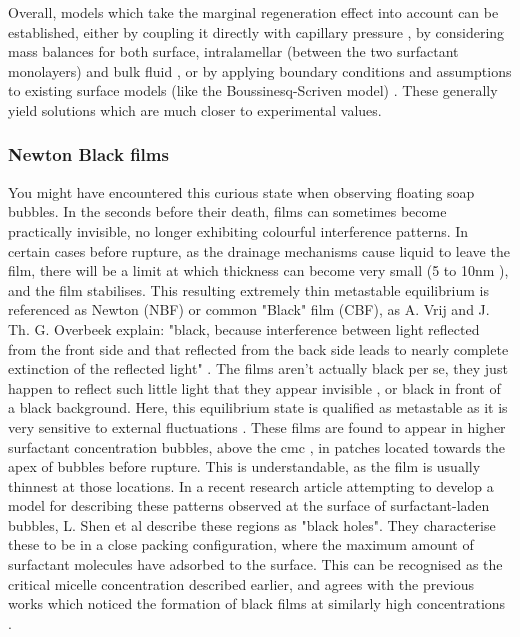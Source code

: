 \documentclass[a4paper,12pt]{article}
\numberwithin{equation}{section}
\numberwithin{figure}{section}
\numberwithin{table}{section}
\begin{document}
Overall, models which take the marginal regeneration effect into account can be established, either by coupling it directly with capillary pressure \cite{Lhuissier2011}, by considering mass balances for both surface, intralamellar (between the two surfactant monolayers) and bulk fluid \cite{Nierstrasz1999}, or by applying boundary conditions and assumptions to existing surface models (like the Boussinesq-Scriven model) \cite{Bhamla2017}. These generally yield solutions which are much closer to experimental values.

\subsubsection{Newton Black films}
\label{sec:blackfilms}

You might have encountered this curious state when observing floating soap bubbles. In the seconds before their death, films can sometimes become practically invisible, no longer exhibiting colourful interference patterns. In certain cases before rupture, as the drainage mechanisms cause liquid to leave the film, there will be a limit at which thickness can become very small (5 to 10nm \cite{Casteletto2003}), and the film stabilises. This resulting extremely thin metastable equilibrium is referenced as Newton (NBF) or common "Black" film (CBF), as A. Vrij and J. Th. G. Overbeek explain: "black, because interference between light reflected from the front side and that reflected from the back side leads to nearly complete extinction of the reflected light" \cite{Vrij1968}. The films aren't actually black per se, they just happen to reflect such little light that they appear invisible \cite{Langevin1994}, or black in front of a black background. Here, this equilibrium state is qualified as metastable as it is very sensitive to external fluctuations \cite{Vrij1968}. These films are found to appear in higher surfactant concentration bubbles, above the cmc \cite{Bhamla2017, Manev1974}, in patches located towards the apex of bubbles before rupture. This is understandable, as the film is usually thinnest at those locations. In a recent research article attempting to develop a model for describing these patterns observed at the surface of surfactant-laden bubbles, L. Shen et al \cite{Shen2020} describe these regions as "black holes". They characterise these to be in a close packing configuration, where the maximum amount of surfactant molecules have adsorbed to the surface. This can be recognised as the critical micelle concentration described earlier, and agrees with the previous works which noticed the formation of black films at similarly high concentrations \cite{Bhamla2017, Manev1974}.
\end{document}
